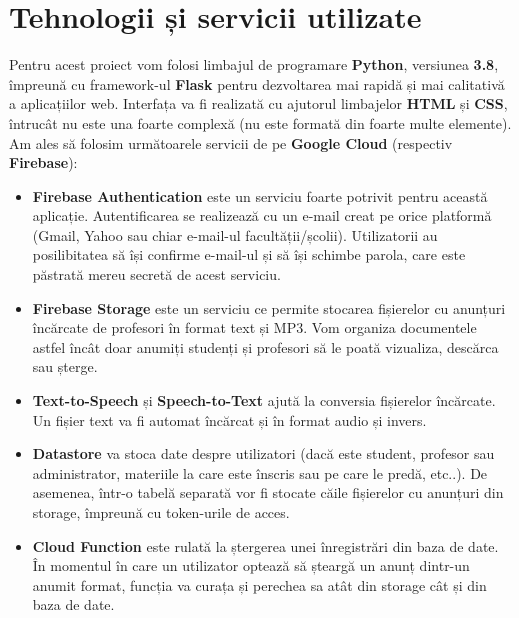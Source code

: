 \documentclass[12pt]{article}
\newcommand\tab[1][1cm]{\hspace*{#1}}
\begin{document}
\section{Tehnologii și servicii utilizate}
\tab Pentru acest proiect vom folosi limbajul de programare \textbf{Python}, versiunea \textbf{3.8}, împreună cu framework-ul \textbf{Flask} pentru dezvoltarea mai rapidă și mai calitativă a aplicațiilor web. Interfața va fi realizată cu ajutorul limbajelor \textbf{HTML} și \textbf{CSS}, întrucât nu este una foarte complexă (nu este formată din foarte multe elemente). \\
Am ales să folosim următoarele servicii de pe \textbf{Google Cloud} (respectiv \textbf{Firebase}):
\begin{itemize}
	\item \textbf{Firebase Authentication} este un serviciu foarte potrivit pentru această aplicație. Autentificarea se realizează cu un e-mail creat pe orice platformă (Gmail, Yahoo sau chiar e-mail-ul facultății/școlii). Utilizatorii au posilibitatea să își confirme e-mail-ul și să își schimbe parola, care este păstrată mereu secretă de acest serviciu.
	\item \textbf{Firebase Storage} este un serviciu ce permite stocarea fișierelor cu anunțuri încărcate de profesori în format text și MP3. Vom organiza documentele astfel încât doar anumiți studenți și profesori să le poată vizualiza, descărca sau șterge. 
	\item \textbf{Text-to-Speech} și \textbf{Speech-to-Text} ajută la conversia fișierelor încărcate. Un fișier text va fi automat încărcat și în format audio și invers.
	\item \textbf{Datastore} va stoca date despre utilizatori (dacă este student, profesor sau administrator, materiile la care este înscris sau pe care le predă, etc..). De asemenea, într-o tabelă separată vor fi stocate căile fișierelor cu anunțuri din storage, împreună cu token-urile de acces.
	\item \textbf{Cloud Function} este rulată la ștergerea unei înregistrări din baza de date. În momentul în care un utilizator optează să șteargă un anunț dintr-un anumit format, funcția va curața și perechea sa atât din storage cât și din baza de date.
\end{itemize}
\end{document}

